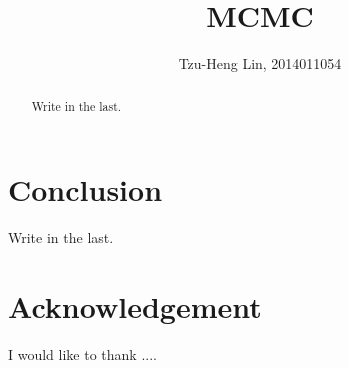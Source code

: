 \documentclass{sig-alternate-05-2015}
\begin{document}
\title{MCMC}
\author{
    \alignauthor Tzu-Heng Lin, 2014011054\\
}


\maketitle
\begin{abstract}
Write in the last.
\end{abstract}




%
%
\printccsdesc





% 
% 
% 
% 


\section{Conclusion} \label{sec:conclusion}
Write in the last.


\renewcommand{\baselinestretch}{1.1}
\balance

\small

\section{Acknowledgement} \label{sec:acknowledgement}
I would like to thank ....




	
\end{document}
